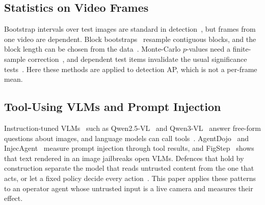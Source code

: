 \subsection{Statistics on Video Frames}
Bootstrap intervals over test images are standard in detection~\cite{everingham2015voc}, but frames from one video are
dependent. Block bootstraps~\cite{kunsch1989,politis1992cbb} resample contiguous blocks, and the block length can be
chosen from the data~\cite{politis2004block,patton2009correction}. Monte-Carlo $p$-values need a finite-sample
correction~\cite{phipson2010pvalues}, and dependent test items invalidate the usual significance
tests~\cite{dror2018hitchhiker}. Here these methods are applied to detection AP, which is not a per-frame mean.

\subsection{Tool-Using VLMs and Prompt Injection}
Instruction-tuned VLMs~\cite{liu2023llava} such as Qwen2.5-VL~\cite{bai2025qwen25vl} and Qwen3-VL~\cite{bai2025qwen3vl}
answer free-form questions about images, and language models can call tools~\cite{schick2023toolformer,yao2023react}.
AgentDojo~\cite{debenedetti2024agentdojo} and InjecAgent~\cite{zhan2024injecagent} measure prompt injection through tool
results, and FigStep~\cite{gong2025figstep} shows that text rendered in an image jailbreaks open VLMs. Defences that
hold by construction separate the model that reads untrusted content from the one that acts, or let a fixed
policy decide every action~\cite{beurerkellner2025patterns,debenedetti2025camel,owasp2025llm}. This paper applies these
patterns to an operator agent whose untrusted input is a live camera and measures their effect.
